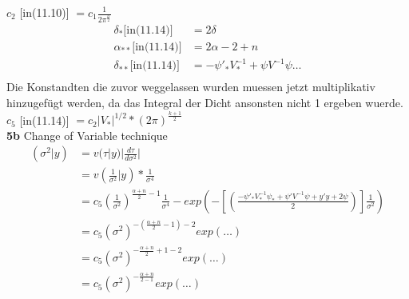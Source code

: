 \documentclass{article}
\begin{document}
$c_2$ [in(11.10)] $=c_1 \frac{1}{2 \pi^{\frac{n}{2}}}$\\
\begin{align*}
\delta_{*} \text{[in(11.14)]} &=2\delta\\
\alpha_{**} \text{[in(11.14)]} &=2\alpha-2+n\\
\delta_{**} \text{[in(11.14)]} &=-\psi'_*V^{-1}_*+\psi V^{-1} \psi \dots \\
\end{align*}
Die Konstandten die zuvor weggelassen wurden muessen jetzt multiplikativ hinzugefügt werden, da das Integral der Dicht ansonsten nicht 1 ergeben wuerde.\\
$c_5$ [in(11.14)] $=c_2 |V_*|^{1/2} *(2\pi)^{\frac{k+1}{2}}$\\

\textbf{5b} Change of Variable technique\\
\begin{align*}
(\sigma^2|y) &= v(\tau|y)|\frac{d \tau}{d \sigma^2}|\\
&= v(\frac{1}{\sigma^2}|y)*\frac{1}{\sigma^4}\\
&=c_5(\frac{1}{\sigma^2 })^{\frac{\alpha+n}{2}-1}\frac{1}{\sigma^4}-exp\left(-\left[\left(\frac{-\psi'_* V^{-1}_* \psi_* + \psi' V^{-1} \psi + y'y+2 \psi}{2}\right) \right] \frac{1}{\sigma^2} \right)\\
&=c_5(\sigma^2)^{-\left(\frac{\alpha+n}{2}-1\right)-2}exp\left(\dots\right)\\
&=c_5(\sigma^2)^{-\frac{\alpha+n}{2}+1-2}exp\left(\dots\right)\\
&=c_5(\sigma^2)^{-\frac{\alpha+n}{2-1}}exp\left(\dots\right)\\
\end{align*}
\end{document}
